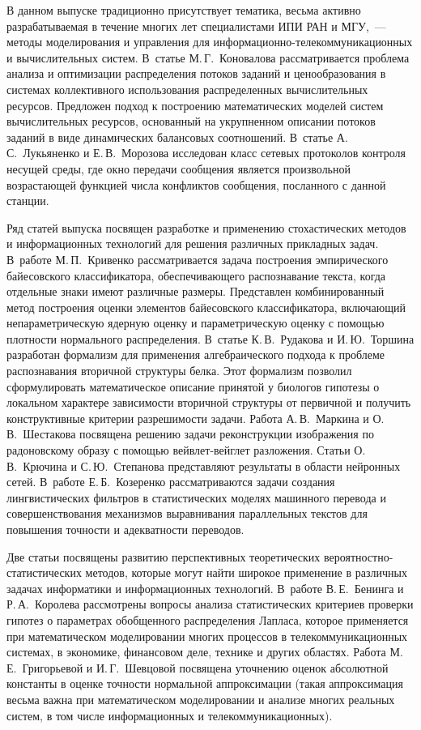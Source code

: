{{{      В данном выпуске традиционно присутствует тематика, весьма активно 
разрабатываемая в течение многих лет специалистами ИПИ РАН и МГУ,~--- методы 
моделирования и управления для ин\-фор\-ма\-ци\-он\-но-те\-ле\-ком\-му\-ни\-ка\-ци\-он\-ных и 
вы\-чис\-ли\-тель\-ных систем. В~статье М.\,Г.~Коновалова рассматривается проблема анализа 
и оптимизации распределения потоков заданий и ценообразования в системах 
коллективного использования распределенных вы\-чис\-ли\-тель\-ных ресурсов. Предложен 
подход к построению математических моделей систем вы\-чис\-ли\-тель\-ных ресурсов, 
основанный на укрупненном описании потоков заданий в виде динамических балансовых 
соотношений. В~статье А.\,С.~Лукьяненко и Е.\,В.~Морозова исследован класс сетевых 
протоколов контроля несущей среды, где окно передачи сообщения является 
произвольной возрастающей функцией числа конфликтов сообщения, посланного с 
данной станции. 
      
      Ряд статей выпуска посвящен разработке и применению стохастических методов и 
информационных технологий для решения различных прикладных задач. В~работе 
М.\,П.~Кривенко рассматривается задача построения эмпирического байесовского 
классификатора, обеспечивающего распознавание текста, когда отдельные знаки имеют 
различные размеры. Представлен комбинированный метод построения оценки элементов 
байесовского классификатора, включающий непараметрическую ядерную оценку и 
параметрическую оценку с помощью плотности нормального распределения. В~статье 
К.\,В.~Рудакова и И.\,Ю.~Торшина разработан формализм для применения 
алгебраического подхода к проблеме распознавания вторичной структуры белка. 
Этот формализм позволил сформулировать математическое описание принятой 
у биологов гипотезы о локальном характере зависимости вторичной структуры от 
первичной и получить конструктивные критерии разрешимости задачи. Работа 
А.\,В.~Маркина и О.\,В.~Шес\-та\-ко\-ва посвящена решению задачи реконструкции 
изображения по радоновскому образу с помощью вейв\-лет-вейг\-лет разложения. Статьи 
О.\,В.~Крючина и С.\,Ю.~Степанова представляют результаты в области нейронных 
сетей. В~работе Е.\,Б.~Козеренко рассматриваются задачи создания лингвистических 
фильт\-ров в статистических моделях машинного перевода и совершенствования 
механизмов выравнивания параллельных текстов для повышения точности и адекватности 
переводов. 
      
      Две статьи посвящены развитию перспективных теоретических вероятностно-статистических 
      методов, которые могут найти широкое применение в различных задачах 
информатики и информационных технологий. В~работе В.\,Е.~Бенинга и Р.\,А.~Королева 
рассмотрены вопросы анализа статистических критериев проверки гипотез о параметрах 
обобщенного распределения Лапласа, которое применяется при 
математическом моделировании многих процессов в телекоммуникационных системах, в 
экономике, финансовом деле, технике и других областях. Работа 
М.\,Е.~Григорьевой и И.\,Г.~Шевцовой 
посвящена уточнению оценок абсолютной константы в оценке точности нормальной 
аппроксимации (такая аппроксимация весьма важна при математическом моделировании 
и анализе многих реальных систем, в том числе информационных и 
телекоммуникационных). 
      
}}}
